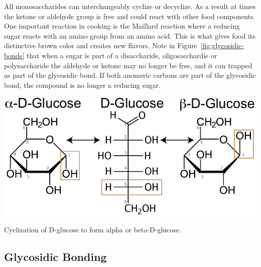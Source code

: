 \documentclass{tufte-handout}
\begin{document}
  All monosaccharides can interchangeably cyclize or decyclize.  As a result at times the ketone or aldehyde group is free and could react with other food components.  One important reaction in cooking is the Maillard reaction where a reducing sugar reacts with an amino group from an amino acid.  This is what gives food its distinctive brown color and creates new flavors.  Note in Figure~\ref{fig:glycosidic-bonds} that when a sugar is part of a disaccharide, oligosacchardie or polysaccharide the aldehyde or ketone may no longer be free, and it can trapped as part of the glycosidic bond.  If both anomeric carbons are part of the glycosidic bond, the compound is no longer a reducing sugar.


\begin{marginfigure}
\includegraphics{figures/Glucose-ab.pdf}
\caption{Cyclization of D-glucose to form alpha or beta-D-glucose.}\label{fig:sugar-ab}
\end{marginfigure}


\subsection{Glycosidic Bonding}
\end{document}
